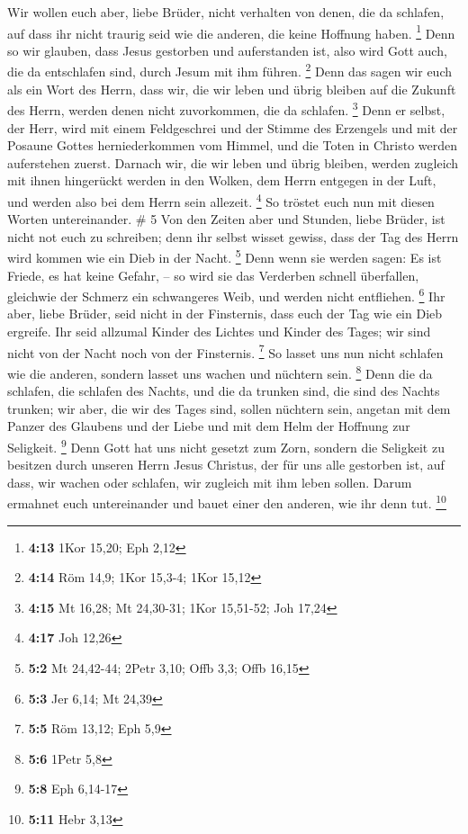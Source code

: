  Wir wollen euch aber, liebe Brüder, nicht verhalten von
denen, die da schlafen, auf dass ihr nicht traurig seid wie die anderen,
die keine Hoffnung haben. \footnote{\textbf{4:13} 1Kor 15,20; Eph 2,12}
 Denn so wir glauben, dass Jesus gestorben und auferstanden
ist, also wird Gott auch, die da entschlafen sind, durch Jesum mit ihm
führen. \footnote{\textbf{4:14} Röm 14,9; 1Kor 15,3-4; 1Kor 15,12}
 Denn das sagen wir euch als ein Wort des Herrn, dass wir,
die wir leben und übrig bleiben auf die Zukunft des Herrn, werden denen
nicht zuvorkommen, die da schlafen. \footnote{\textbf{4:15} Mt 16,28; Mt
  24,30-31; 1Kor 15,51-52; Joh 17,24}  Denn er selbst, der
Herr, wird mit einem Feldgeschrei und der Stimme des Erzengels und mit
der Posaune Gottes herniederkommen vom Himmel, und die Toten in Christo
werden auferstehen zuerst.  Darnach wir, die wir leben und
übrig bleiben, werden zugleich mit ihnen hingerückt werden in den
Wolken, dem Herrn entgegen in der Luft, und werden also bei dem Herrn
sein allezeit. \footnote{\textbf{4:17} Joh 12,26}  So
tröstet euch nun mit diesen Worten untereinander. \# 5  Von
den Zeiten aber und Stunden, liebe Brüder, ist nicht not euch zu
schreiben;  denn ihr selbst wisset gewiss, dass der Tag des
Herrn wird kommen wie ein Dieb in der Nacht. \footnote{\textbf{5:2} Mt
  24,42-44; 2Petr 3,10; Offb 3,3; Offb 16,15}  Denn wenn sie
werden sagen: Es ist Friede, es hat keine Gefahr, -- so wird sie das
Verderben schnell überfallen, gleichwie der Schmerz ein schwangeres
Weib, und werden nicht entfliehen. \footnote{\textbf{5:3} Jer 6,14; Mt
  24,39}  Ihr aber, liebe Brüder, seid nicht in der
Finsternis, dass euch der Tag wie ein Dieb ergreife.  Ihr
seid allzumal Kinder des Lichtes und Kinder des Tages; wir sind nicht
von der Nacht noch von der Finsternis. \footnote{\textbf{5:5} Röm 13,12;
  Eph 5,9}  So lasset uns nun nicht schlafen wie die
anderen, sondern lasset uns wachen und nüchtern sein. \footnote{\textbf{5:6}
  1Petr 5,8}  Denn die da schlafen, die schlafen des Nachts,
und die da trunken sind, die sind des Nachts trunken;  wir
aber, die wir des Tages sind, sollen nüchtern sein, angetan mit dem
Panzer des Glaubens und der Liebe und mit dem Helm der Hoffnung zur
Seligkeit. \footnote{\textbf{5:8} Eph 6,14-17}  Denn Gott
hat uns nicht gesetzt zum Zorn, sondern die Seligkeit zu besitzen durch
unseren Herrn Jesus Christus,  der für uns alle gestorben
ist, auf dass, wir wachen oder schlafen, wir zugleich mit ihm leben
sollen.  Darum ermahnet euch untereinander und bauet einer
den anderen, wie ihr denn tut. \footnote{\textbf{5:11} Hebr 3,13}

